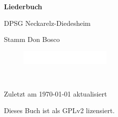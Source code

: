 \begin{titlepage}
\begin{center}
{\sffamily\huge\bfseries Liederbuch\par}
\vspace{1cm}
{\sffamily\Large DPSG Neckarelz-Diedesheim\par}
\vspace{0.5cm}
{\sffamily\Large Stamm Don Bosco\par}
\vspace{0.5cm}
\begin{figure}[h]
\centering
\includegraphics[width=0.4\textwidth]{img/logo.jpg}\par\
\end{figure}
{\sffamily\small Zuletzt am \today{} aktualisiert\par}
\vspace{0.5cm}
{\sffamily\tiny Dieses Buch ist als GPLv2 lizensiert.\par}
\end{center}
\end{titlepage}

